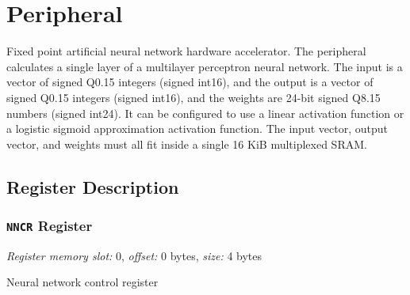 \newpage



\section{ Peripheral} \label{peripheralNNx}
Fixed point artificial neural network hardware accelerator. The peripheral calculates a single layer of a multilayer perceptron neural network. The input is a vector of signed Q0.15 integers (signed int16), and the output is a vector of signed Q0.15 integers (signed int16), and the weights are 24-bit signed Q8.15 numbers (signed int24). It can be configured to use a linear activation function or a logistic sigmoid approximation activation function. The input vector, output vector, and weights must all fit inside a single 16 KiB multiplexed SRAM.

\subsection{Register Description}

\subsubsection{\texttt{NNCR} Register} \label{ss:NNxCR}
\noindent \textit{Register memory slot:} 0, \textit{offset:} 0 bytes, \textit{size:} 4 bytes

\noindent Neural network control register

